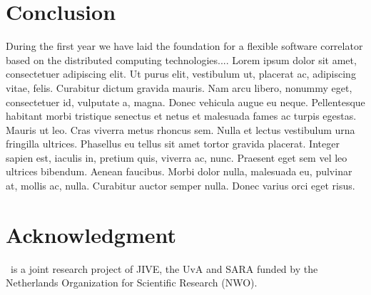 \section{Conclusion}
During the first year we have laid the foundation for a flexible software correlator based on 
the distributed computing technologies....
Lorem ipsum dolor sit amet, consectetuer
adipiscing elit. Ut purus elit, vestibulum ut, placerat ac,
adipiscing vitae, felis. Curabitur dictum gravida mauris. Nam arcu
libero, nonummy eget, consectetuer id, vulputate a, magna. Donec
vehicula augue eu neque. Pellentesque habitant morbi tristique
senectus et netus et malesuada fames ac turpis egestas. Mauris ut
leo. Cras viverra metus rhoncus sem. Nulla et lectus vestibulum urna
fringilla ultrices. Phasellus eu tellus sit amet tortor gravida
placerat. Integer sapien est, iaculis in, pretium quis, viverra ac,
nunc. Praesent eget sem vel leo ultrices bibendum. Aenean faucibus.
Morbi dolor nulla, malesuada eu, pulvinar at, mollis ac, nulla.
Curabitur auctor semper nulla. Donec varius orci eget risus. 

\section{Acknowledgment}
\scarie\ is a joint research project of JIVE, the UvA and SARA funded by the Netherlands Organization for Scientific Research (NWO). 


